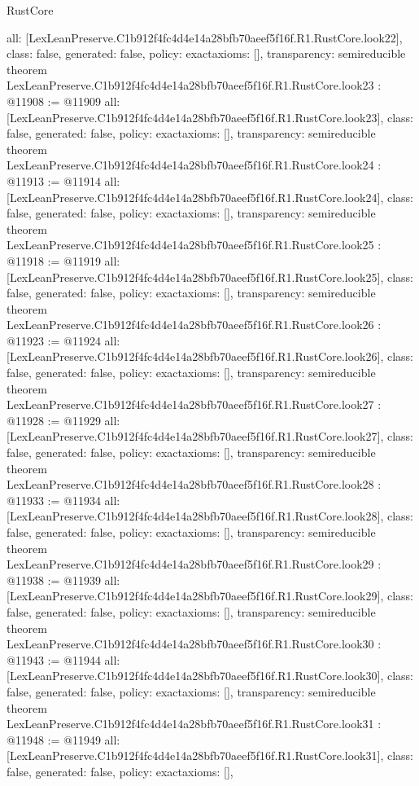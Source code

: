 \begin{lexlean}{RustCore}
\begin{coremodule}
{  all: [LexLeanPreserve.C1b912f4fc4d4e14a28bfb70aeef5f16f.R1.RustCore.look22],
  class: false,
  generated: false,
  policy: exact{axioms: []},
  transparency: semireducible
}
theorem LexLeanPreserve.C1b912f4fc4d4e14a28bfb70aeef5f16f.R1.RustCore.look23 : @11908 := @11909 {
  all: [LexLeanPreserve.C1b912f4fc4d4e14a28bfb70aeef5f16f.R1.RustCore.look23],
  class: false,
  generated: false,
  policy: exact{axioms: []},
  transparency: semireducible
}
theorem LexLeanPreserve.C1b912f4fc4d4e14a28bfb70aeef5f16f.R1.RustCore.look24 : @11913 := @11914 {
  all: [LexLeanPreserve.C1b912f4fc4d4e14a28bfb70aeef5f16f.R1.RustCore.look24],
  class: false,
  generated: false,
  policy: exact{axioms: []},
  transparency: semireducible
}
theorem LexLeanPreserve.C1b912f4fc4d4e14a28bfb70aeef5f16f.R1.RustCore.look25 : @11918 := @11919 {
  all: [LexLeanPreserve.C1b912f4fc4d4e14a28bfb70aeef5f16f.R1.RustCore.look25],
  class: false,
  generated: false,
  policy: exact{axioms: []},
  transparency: semireducible
}
theorem LexLeanPreserve.C1b912f4fc4d4e14a28bfb70aeef5f16f.R1.RustCore.look26 : @11923 := @11924 {
  all: [LexLeanPreserve.C1b912f4fc4d4e14a28bfb70aeef5f16f.R1.RustCore.look26],
  class: false,
  generated: false,
  policy: exact{axioms: []},
  transparency: semireducible
}
theorem LexLeanPreserve.C1b912f4fc4d4e14a28bfb70aeef5f16f.R1.RustCore.look27 : @11928 := @11929 {
  all: [LexLeanPreserve.C1b912f4fc4d4e14a28bfb70aeef5f16f.R1.RustCore.look27],
  class: false,
  generated: false,
  policy: exact{axioms: []},
  transparency: semireducible
}
theorem LexLeanPreserve.C1b912f4fc4d4e14a28bfb70aeef5f16f.R1.RustCore.look28 : @11933 := @11934 {
  all: [LexLeanPreserve.C1b912f4fc4d4e14a28bfb70aeef5f16f.R1.RustCore.look28],
  class: false,
  generated: false,
  policy: exact{axioms: []},
  transparency: semireducible
}
theorem LexLeanPreserve.C1b912f4fc4d4e14a28bfb70aeef5f16f.R1.RustCore.look29 : @11938 := @11939 {
  all: [LexLeanPreserve.C1b912f4fc4d4e14a28bfb70aeef5f16f.R1.RustCore.look29],
  class: false,
  generated: false,
  policy: exact{axioms: []},
  transparency: semireducible
}
theorem LexLeanPreserve.C1b912f4fc4d4e14a28bfb70aeef5f16f.R1.RustCore.look30 : @11943 := @11944 {
  all: [LexLeanPreserve.C1b912f4fc4d4e14a28bfb70aeef5f16f.R1.RustCore.look30],
  class: false,
  generated: false,
  policy: exact{axioms: []},
  transparency: semireducible
}
theorem LexLeanPreserve.C1b912f4fc4d4e14a28bfb70aeef5f16f.R1.RustCore.look31 : @11948 := @11949 {
  all: [LexLeanPreserve.C1b912f4fc4d4e14a28bfb70aeef5f16f.R1.RustCore.look31],
  class: false,
  generated: false,
  policy: exact{axioms: []},
}
\end{coremodule}
\end{lexlean}
